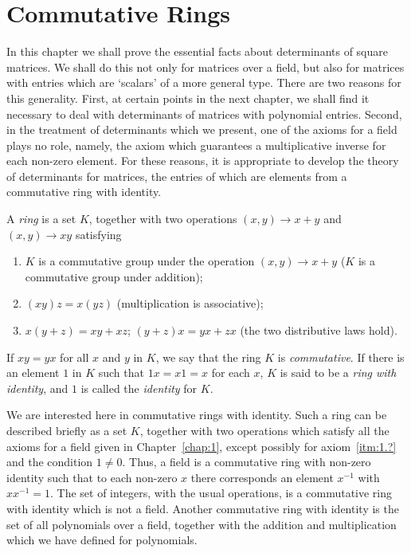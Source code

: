 \section{Commutative Rings}

In this chapter we shall prove the essential facts about determinants of square matrices. We shall do this not only for matrices over a field, but also for matrices with entries which are `scalars' of a more general type. There are two reasons for this generality. First, at certain points in the next chapter, we shall find it necessary to deal with determinants of matrices with polynomial entries. Second, in the treatment of determinants which we present, one of the axioms for a field plays no role, namely, the axiom which guarantees a multiplicative inverse for each non-zero element. For these reasons, it is appropriate to develop the theory of determinants for matrices, the entries of which are elements from a commutative ring with identity.

\begin{definition}
    A \emph{ring} is a set \(K\), together with two operations \(\left(x,y\right)\to x+y\) and \(\left(x,y\right)\to xy\) satisfying
    \begin{enumerate}
        \item \(K\) is a commutative group under the operation \(\left(x,y\right)\to x+y\) (\(K\) is a commutative group under addition);
        \item \(\left(xy\right)z=x\left(yz\right)\) (multiplication is associative);
        \item \(x\left(y+z\right)=xy+xz\); \(\left(y+z\right)x=yx+zx\) (the two distributive laws hold).
    \end{enumerate}
    If \(xy=yx\) for all \(x\) and \(y\) in \(K\), we say that the ring \(K\) is \emph{commutative}. If there is an element \(1\) in \(K\) such that \(1x=x1=x\) for each \(x\), \(K\) is said to be a \emph{ring with identity}, and \(1\) is called the \emph{identity} for \(K\). 
\end{definition}

We are interested here in commutative rings with identity. Such a ring can be described briefly as a set \(K\), together with two operations which satisfy all the axioms for a field given in Chapter~\ref{chap:1}, except possibly for axiom~\ref{itm:1.?} and the condition \(1\ne0\). Thus, a field is a commutative ring with non-zero identity such that to each non-zero \(x\) there corresponds an element \(x^{-1}\) with \(xx^{-1}=1\). The set of integers, with the usual operations, is a commutative ring with identity which is not a field. Another commutative ring with identity is the set of all polynomials over a field, together with the addition and multiplication which we have defined for polynomials.

